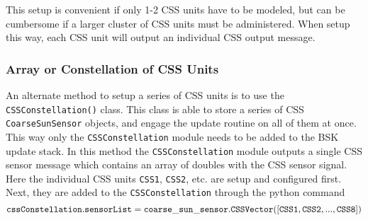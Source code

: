 This setup is convenient if only 1-2 CSS units have to be modeled, but can be cumbersome if a larger cluster of CSS units must be administered.  When setup this way, each CSS unit will output an individual CSS output message.

\subsubsection{Array or Constellation of CSS Units}
An alternate method to setup a series of CSS units is to use the {\tt CSSConstellation()} class.  This class is able to store a series of CSS {\tt CoarseSunSensor} objects, and engage the update routine on all of them at once.  This way only the {\tt CSSConstellation} module needs to be added to the BSK update stack.  In this method the 
{\tt CSSConstellation} module outputs a single CSS sensor message which contains an array of doubles with the CSS sensor signal.  Here the individual CSS units {\tt CSS1}, {\tt CSS2}, etc. are setup and configured first.  Next, they are added to the {\tt CSSConstellation} through the python command
$$
	{\tt cssConstellation.sensorList = coarse\_sun\_sensor.CSSVector([CSS1, CSS2, ..., CSS8])}
$$

